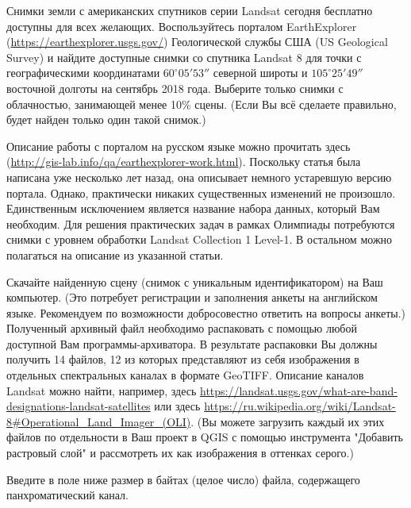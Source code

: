 
Снимки земли с американских спутников серии Landsat сегодня бесплатно доступны для всех желающих. 
Воспользуйтесь порталом EarthExplorer \linebreak (\url{https://earthexplorer.usgs.gov/}) Геологической службы 
США (US Geological \linebreak Survey) и найдите доступные снимки со спутника Landsat 8 для точки 
с географическими координатами $60^{\circ}05'53''$ северной широты и $105^{\circ}25'49''$ восточной долготы 
на сентябрь 2018 года. Выберите только снимки с облачностью, занимающей менее 10\% сцены. 
(Если Вы всё сделаете правильно, будет найден только один такой снимок.)

Описание работы с порталом на русском языке можно прочитать здесь (\url{http://gis-lab.info/qa/earthexplorer-work.html}). 
Поскольку статья была написана уже несколько лет назад, она описывает немного устаревшую версию портала. Однако, практически никаких существенных изменений не произошло. Единственным исключением является название набора данных, который Вам необходим. Для решения практических задач в рамках Олимпиады потребуются снимки с уровнем обработки Landsat Collection 1 Level-1. В остальном можно полагаться на описание из указанной статьи.

Скачайте найденную сцену (снимок с уникальным идентификатором) на Ваш компьютер. 
(Это потребует регистрации и заполнения анкеты на английском языке. Рекомендуем по возможности 
добросовестно ответить на вопросы анкеты.) Полученный архивный файл необходимо распаковать с 
помощью любой доступной Вам программы-архиватора. В результате распаковки Вы должны получить 14 файлов, 
12 из которых представляют из себя изображения в отдельных спектральных каналах в формате GeoTIFF. 
Описание каналов Landsat можно найти, например, здесь \url{https://landsat.usgs.gov/what-are-band-designations-landsat-satellites} или 
здесь \url{https://ru.wikipedia.org/wiki/Landsat-8#Operational_Land_Imager_(OLI)}. (Вы можете загрузить каждый их этих файлов по отдельности в Ваш проект в QGIS с помощью инструмента "Добавить растровый слой" и рассмотреть их как изображения в оттенках серого.)

Введите в поле ниже размер в байтах (целое число) файла, содержащего панхроматический канал.